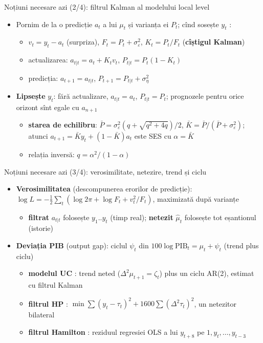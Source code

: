 \begin{frame}{Noțiuni necesare azi (2/4): filtrul Kalman al modelului local level}
\itemsize{\small}
\begin{itemize}
    \item Pornim de la o predicție $a_t$ a lui $\mu_t$ și varianța ei $P_t$; cînd sosește $y_t$ :
    \begin{itemize}
        \item $v_t = y_t - a_t$ (surpriza), \quad $F_t = P_t + \sigma^2_\varepsilon$, \quad $K_t = P_t/F_t$ (\textbf{cîștigul Kalman})
        \item actualizarea: $a_{t|t} = a_t + K_tv_t$, \quad $P_{t|t} = P_t(1 - K_t)$
        \item predicția: $a_{t+1} = a_{t|t}$, \quad $P_{t+1} = P_{t|t} + \sigma^2_\eta$
    \end{itemize}
    \item \textbf{Lipsește} $y_t$: fără actualizare, $a_{t|t} = a_t$, $P_{t|t} = P_t$; prognozele pentru orice orizont sînt egale cu $a_{n+1}$
    \begin{itemize}
        \item \textbf{starea de echilibru}: $\bar P = \sigma^2_\varepsilon(q + \sqrt{q^2 + 4q})/2$, $\bar K = \bar P/(\bar P + \sigma^2_\varepsilon)$; atunci $a_{t+1} = \bar Ky_t + (1 - \bar K)a_t$ este SES cu $\alpha = \bar K$ 
        \item relația inversă: $q = \alpha^2/(1 - \alpha)$
    \end{itemize}
\end{itemize}
\end{frame}

\begin{frame}{Noțiuni necesare azi (3/4): verosimilitate, netezire, trend și ciclu}
\itemsize{\small}
\begin{itemize}
    \item \textbf{Verosimilitatea} (descompunerea erorilor de predicție): $\log L = -\frac12\sum_t(\log 2\pi + \log F_t + v_t^2/F_t)$, maximizată după varianțe
    \begin{itemize}
        \item \textbf{filtrat} $a_{t|t}$ folosește $y_1..y_t$ (timp real); \textbf{netezit} $\hat\mu_t$ folosește tot eșantionul (istorie) 
    \end{itemize}
    \item \textbf{Deviația PIB} (output gap): ciclul $\psi_t$ din $100\log\mathrm{PIB}_t = \mu_t + \psi_t$ (trend plus ciclu)
    \begin{itemize}
        \item \textbf{modelul UC} : trend neted ($\Delta^2\mu_{t+1} = \zeta_t$) plus un ciclu AR(2), estimat cu filtrul Kalman
        \item \textbf{filtrul HP} : $\min\sum(y_t - \tau_t)^2 + 1600\sum(\Delta^2\tau_t)^2$, un netezitor bilateral
        \item \textbf{filtrul Hamilton} : reziduul regresiei OLS a lui $y_{t+8}$ pe $1, y_t, \dots, y_{t-3}$
    \end{itemize}
\end{itemize}
\end{frame}


